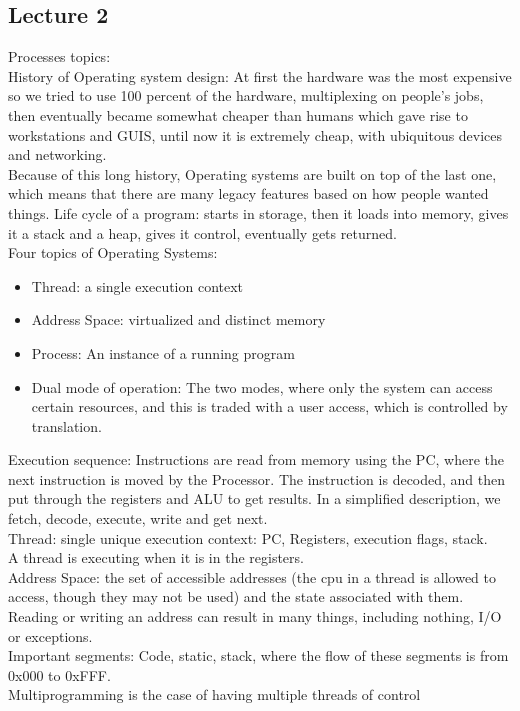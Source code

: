\documentclass[paper=a4, fontsize=11pt]{scrartcl} %
\numberwithin{equation}{section} %
\numberwithin{figure}{section} %
\numberwithin{table}{section} %
\begin{document}
\subsection{Lecture 2}
Processes topics:\\
History of Operating system design: At first the hardware was the most expensive so we tried to use 100 percent of the hardware, multiplexing on people's jobs, then eventually became somewhat cheaper than humans which gave rise to workstations and GUIS, until now it is extremely cheap, with ubiquitous devices and networking.\\
Because of this long history, Operating systems are built on top of the last one, which means that there are many legacy features based on how people wanted things.
Life cycle of a program: starts in storage, then it loads into memory, gives it a stack and a heap, gives it control, eventually gets returned.\\
Four topics of Operating Systems: 
\begin{itemize}
	\item Thread: a single execution context
    \item Address Space: virtualized and distinct memory
    \item Process: An instance of a running program
    \item Dual mode of operation: The two modes, where only the system can access certain resources, and this is traded with a user access, which is controlled by translation.
\end{itemize}
Execution sequence: Instructions are read from memory using the PC, where the next instruction is moved by the Processor. The instruction is decoded, and then put through the registers and ALU to get results. In a simplified description, we fetch, decode, execute, write and get next.\\
Thread: single unique execution context: PC, Registers, execution flags, stack.\\
A thread is executing when it is in the registers. \\
Address Space: the set of accessible addresses (the cpu in a thread is allowed to access, though they may not be used) and the state associated with them. Reading or writing an address can result in many things, including nothing, I/O or exceptions. \\
Important segments: Code, static, stack, where the flow of these segments is from 0x000 to 0xFFF. \\
Multiprogramming is the case of having multiple threads of control \\
\end{document}
